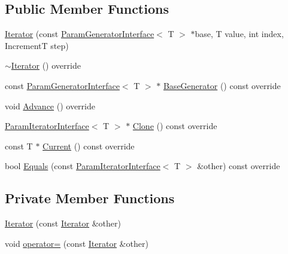 \subsection*{Public Member Functions}
\begin{DoxyCompactItemize}
\item 
\hyperlink{classtesting_1_1internal_1_1RangeGenerator_1_1Iterator_a960184d2ea0ff223d9cf4d6ab015baa8}{Iterator} (const \hyperlink{classtesting_1_1internal_1_1ParamGeneratorInterface}{Param\+Generator\+Interface}$<$ T $>$ $\ast$base, T value, int index, IncrementT step)
\item 
\hyperlink{classtesting_1_1internal_1_1RangeGenerator_1_1Iterator_a09f0f9f1d40f7a3d04e4e82f7274b2ab}{$\sim$\+Iterator} () override
\item 
const \hyperlink{classtesting_1_1internal_1_1ParamGeneratorInterface}{Param\+Generator\+Interface}$<$ T $>$ $\ast$ \hyperlink{classtesting_1_1internal_1_1RangeGenerator_1_1Iterator_aa1dc4151e1eed1c546059ecb4f72440b}{Base\+Generator} () const override
\item 
void \hyperlink{classtesting_1_1internal_1_1RangeGenerator_1_1Iterator_ad17bd99e352c43b8ab654a4ad479d06e}{Advance} () override
\item 
\hyperlink{classtesting_1_1internal_1_1ParamIteratorInterface}{Param\+Iterator\+Interface}$<$ T $>$ $\ast$ \hyperlink{classtesting_1_1internal_1_1RangeGenerator_1_1Iterator_a61a764294b66272d730f5ff5e0acdcf4}{Clone} () const override
\item 
const T $\ast$ \hyperlink{classtesting_1_1internal_1_1RangeGenerator_1_1Iterator_acbdfc5919d37fb9514914afb041e50ff}{Current} () const override
\item 
bool \hyperlink{classtesting_1_1internal_1_1RangeGenerator_1_1Iterator_a534406abbddb137d7672c2b53d5bff0b}{Equals} (const \hyperlink{classtesting_1_1internal_1_1ParamIteratorInterface}{Param\+Iterator\+Interface}$<$ T $>$ \&other) const override
\end{DoxyCompactItemize}
\subsection*{Private Member Functions}
\begin{DoxyCompactItemize}
\item 
\hyperlink{classtesting_1_1internal_1_1RangeGenerator_1_1Iterator_a14150df56c79ae26f1beaea1e7548ebc}{Iterator} (const \hyperlink{classtesting_1_1internal_1_1RangeGenerator_1_1Iterator}{Iterator} \&other)
\item 
void \hyperlink{classtesting_1_1internal_1_1RangeGenerator_1_1Iterator_acd95aafca4a92db473dd4a88bbc9ab1b}{operator=} (const \hyperlink{classtesting_1_1internal_1_1RangeGenerator_1_1Iterator}{Iterator} \&other)
\end{DoxyCompactItemize}
